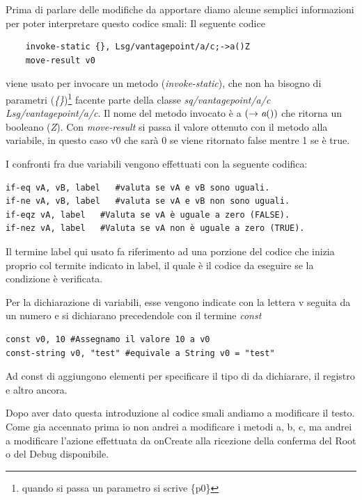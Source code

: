\documentclass{article}
\begin{document}
Prima di parlare delle modifiche da apportare diamo alcune semplici informazioni per poter interpretare questo codice smali:
Il seguente codice
\begin{verbatim}
    invoke-static {}, Lsg/vantagepoint/a/c;->a()Z
    move-result v0
\end{verbatim}
viene usato per invocare un metodo (\emph{invoke-static}), che non ha bisogno di parametri (\emph{\{\}})\footnote{quando si passa un parametro si scrive \{p0\}}
 facente 
parte della classe \textit{sq/vantagepoint/a/c} {\emph{Lsg/vantagepoint/a/c}}. Il nome del metodo invocato è a $( \rightarrow\emph{a}())$ che ritorna un 
booleano (\emph{Z}). Con \emph{move-result} si passa il valore ottenuto con il metodo alla variabile, in questo caso v0 che sarà 0 se viene ritornato false 
mentre 1 se è true.

I confronti fra due variabili vengono effettuati con la seguente codifica:
\begin{verbatim}
if-eq vA, vB, label   #valuta se vA e vB sono uguali.
if-ne vA, vB, label   #valuta se vA e vB non sono uguali.
if-eqz vA, label   #Valuta se vA è uguale a zero (FALSE).
if-nez vA, label   #Valuta se vA non è uguale a zero (TRUE).
\end{verbatim}
Il termine label qui usato fa riferimento ad una porzione del codice che inizia proprio col termite indicato in label,
il quale è il codice da eseguire se la condizione è verificata.

Per la dichiarazione di variabili, esse vengono indicate con la lettera v seguita da un numero e si dichiarano precedendole con il termine \emph{const}
\begin{verbatim}
const v0, 10 #Assegnamo il valore 10 a v0
const-string v0, "test" #equivale a String v0 = "test"
\end{verbatim}
Ad const di aggiungono elementi per specificare il tipo di da dichiarare, il registro e altro ancora.

Dopo aver dato questa introduzione al codice smali andiamo a modificare il testo. Come gia accennato prima io non andrei a modificare i 
metodi a, b, c, ma andrei a modificare l'azione effettuata da onCreate alla ricezione della conferma del Root o del Debug disponibile.
\end{document}

